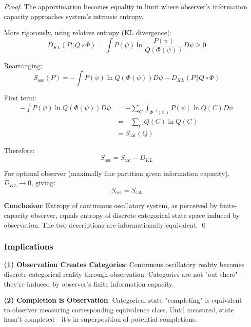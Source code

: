 \documentclass[11pt,onecolumn]{article}
\begin{document}
\begin{proof}
The approximation becomes equality in limit where observer's information capacity approaches system's intrinsic entropy.

More rigorously, using relative entropy (KL divergence):
\begin{equation}
D_{KL}(P || Q \circ \Phi) = \int P(\psi) \ln \frac{P(\psi)}{Q(\Phi(\psi))} D\psi \geq 0
\end{equation}

Rearranging:
\begin{equation}
S_{\text{osc}}(P) = -\int P(\psi) \ln Q(\Phi(\psi)) D\psi - D_{KL}(P || Q \circ \Phi)
\end{equation}

First term:
\begin{align}
-\int P(\psi) \ln Q(\Phi(\psi)) D\psi &= -\sum_{C} \int_{\Phi^{-1}(C)} P(\psi) \ln Q(C) D\psi \\
&= -\sum_{C} Q(C) \ln Q(C) \\
&= S_{\text{cat}}(Q)
\end{align}

Therefore:
\begin{equation}
S_{\text{osc}} = S_{\text{cat}} - D_{KL}
\end{equation}

For optimal observer (maximally fine partition given information capacity), $D_{KL} \to 0$, giving:
\begin{equation}
S_{\text{osc}} = S_{\text{cat}}
\end{equation}

\textbf{Conclusion}: Entropy of continuous oscillatory system, as perceived by finite-capacity observer, equals entropy of discrete categorical state space induced by observation. The two descriptions are informationally equivalent. \qed
\end{proof}

\subsubsection{Implications}

\textbf{(1) Observation Creates Categories}: Continuous oscillatory reality becomes discrete categorical reality through observation. Categories are not "out there"---they're induced by observer's finite information capacity.

\textbf{(2) Completion is Observation}: Categorical state "completing" is equivalent to observer measuring corresponding equivalence class. Until measured, state hasn't completed---it's in superposition of potential completions.
\end{document}

